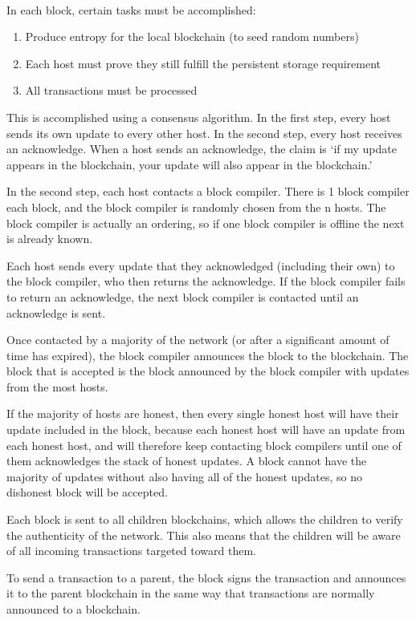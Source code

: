 \documentclass[a4paper,10pt]{article}
\begin{document}
\paragraph{}
	In each block, certain tasks must be accomplished:
\begin{enumerate}
\item Produce entropy for the local blockchain (to seed random numbers)
\item Each host must prove they still fulfill the persistent storage 
requirement
\item All transactions must be processed
\end{enumerate}
\par
	This is accomplished using a consensus algorithm. In the first step, 
every host sends its own update to every other host. In the second step, every 
host receives an acknowledge. When a host sends an acknowledge, the claim is 
‘if my update appears in the blockchain, your update will also appear in the 
blockchain.’
\par
	In the second step, each host contacts a block compiler. There is 1 
block compiler each block, and the block compiler is randomly chosen from the n 
hosts. The block compiler is actually an ordering, so if one block compiler is 
offline the next is already known.
\par
	Each host sends every update that they acknowledged (including their 
own) to the block compiler, who then returns the acknowledge. If the block 
compiler fails to return an acknowledge, the next block compiler is contacted 
until an acknowledge is sent.
\par
Once contacted by a majority of the network (or after a significant amount of 
time has expired), the block compiler announces the block to the blockchain. 
The block that is accepted is the block announced by the block compiler with 
updates from the most hosts.
\par
If the majority of hosts are honest, then every single honest host will have 
their update included in the block, because each honest host will have an 
update from each honest host, and will therefore keep contacting block 
compilers until one of them acknowledges the stack of honest updates. A block 
cannot have the majority of updates without also having all of the honest 
updates, so no dishonest block will be accepted.
\par
Each block is sent to all children blockchains, which allows the children to 
verify the authenticity of the network. This also means that the children will 
be aware of all incoming transactions targeted toward them.
\par
	To send a transaction to a parent, the block signs the transaction and 
announces it to the parent blockchain in the same way that transactions are 
normally announced to a blockchain.
\end{document}
